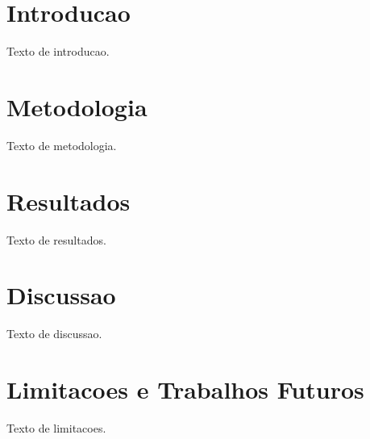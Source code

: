 \documentclass{article}
\begin{document}
\section{Introducao}
Texto de introducao.
\section{Metodologia}
Texto de metodologia.
\section{Resultados}
Texto de resultados.
\section{Discussao}
Texto de discussao.
\section{Limitacoes e Trabalhos Futuros}
Texto de limitacoes.
\end{document}
